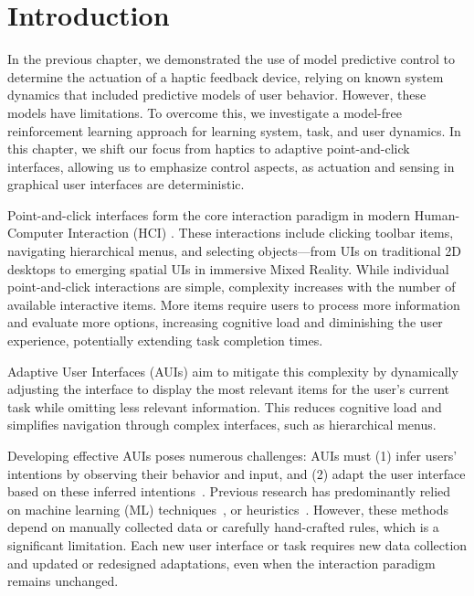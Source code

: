 \section{Introduction}
In the previous chapter, we demonstrated the use of model predictive control to determine the actuation of a haptic feedback device, relying on known system dynamics that included predictive models of user behavior. However, these models have limitations. To overcome this, we investigate a model-free reinforcement learning approach for learning system, task, and user dynamics. In this chapter, we shift our focus from haptics to adaptive point-and-click interfaces, allowing us to emphasize control aspects, as actuation and sensing in graphical user interfaces are deterministic.

Point-and-click interfaces form the core interaction paradigm in modern Human-Computer Interaction (HCI) \cite{reilly2005just, kemp2008point, lafuente2023comparing}. These interactions include clicking toolbar items, navigating hierarchical menus, and selecting objects—from UIs on traditional 2D desktops to emerging spatial UIs in immersive Mixed Reality. While individual point-and-click interactions are simple, complexity increases with the number of available interactive items. More items require users to process more information and evaluate more options, increasing cognitive load and diminishing the user experience, potentially extending task completion times.

Adaptive User Interfaces (AUIs) aim to mitigate this complexity by dynamically adjusting the interface to display the most relevant items for the user's current task while omitting less relevant information. This reduces cognitive load and simplifies navigation through complex interfaces, such as hierarchical menus.

Developing effective AUIs poses numerous challenges: AUIs must (1) infer users' intentions by observing their behavior and input, and (2) adapt the user interface based on these inferred intentions~\cite{oulasvirta2018computational}. Previous research has predominantly relied on machine learning (ML) techniques~\cite{Shen2009a, Shen2009b, todi2021adapting, gebhardt2019learning}, or heuristics~\cite{Browne1990,Stephanidis1997,Smith2010}. However, these methods depend on manually collected data or carefully hand-crafted rules, which is a significant limitation. Each new user interface or task requires new data collection and updated or redesigned adaptations, even when the interaction paradigm remains unchanged.

